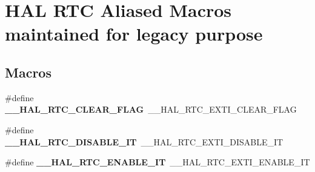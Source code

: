 \hypertarget{group___h_a_l___r_t_c___aliased___macros}{}\section{H\+AL R\+TC Aliased Macros maintained for legacy purpose}
\label{group___h_a_l___r_t_c___aliased___macros}
\subsection*{Macros}
\begin{DoxyCompactItemize}
\item 
\#define {\bfseries \+\_\+\+\_\+\+H\+A\+L\+\_\+\+R\+T\+C\+\_\+\+C\+L\+E\+A\+R\+\_\+\+F\+L\+AG}~\+\_\+\+\_\+\+H\+A\+L\+\_\+\+R\+T\+C\+\_\+\+E\+X\+T\+I\+\_\+\+C\+L\+E\+A\+R\+\_\+\+F\+L\+AG\hypertarget{group___h_a_l___r_t_c___aliased___macros_gaf8b41c0f2f096d2e71f304c00d183e4d}{}\label{group___h_a_l___r_t_c___aliased___macros_gaf8b41c0f2f096d2e71f304c00d183e4d}

\item 
\#define {\bfseries \+\_\+\+\_\+\+H\+A\+L\+\_\+\+R\+T\+C\+\_\+\+D\+I\+S\+A\+B\+L\+E\+\_\+\+IT}~\+\_\+\+\_\+\+H\+A\+L\+\_\+\+R\+T\+C\+\_\+\+E\+X\+T\+I\+\_\+\+D\+I\+S\+A\+B\+L\+E\+\_\+\+IT\hypertarget{group___h_a_l___r_t_c___aliased___macros_gae758f64dcd336b7e63308d205cd92697}{}\label{group___h_a_l___r_t_c___aliased___macros_gae758f64dcd336b7e63308d205cd92697}

\item 
\#define {\bfseries \+\_\+\+\_\+\+H\+A\+L\+\_\+\+R\+T\+C\+\_\+\+E\+N\+A\+B\+L\+E\+\_\+\+IT}~\+\_\+\+\_\+\+H\+A\+L\+\_\+\+R\+T\+C\+\_\+\+E\+X\+T\+I\+\_\+\+E\+N\+A\+B\+L\+E\+\_\+\+IT\hypertarget{group___h_a_l___r_t_c___aliased___macros_ga530c1a5aba6a657bf37fbfb6fb6c4ebc}{}\label{group___h_a_l___r_t_c___aliased___macros_ga530c1a5aba6a657bf37fbfb6fb6c4ebc}


\end{DoxyCompactItemize}
